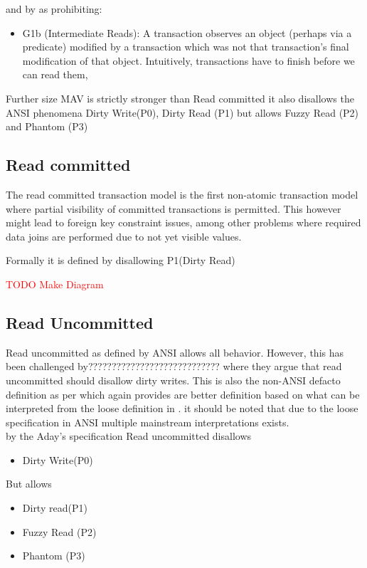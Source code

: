 \documentclass[a4paper,10pt,titlepage]{report}
\begin{document}
and by \cite{Adya99weakconsistency:} as prohibiting:
\begin{itemize}
    \item G1b (Intermediate Reads): A transaction observes an object (perhaps via a predicate) modified by a transaction which was not that transaction's final modification of that object. Intuitively, transactions have to finish before we can read them,
\end{itemize}

Further size MAV is strictly stronger than Read committed it also disallows the ANSI phenomena Dirty Write(P0), Dirty Read (P1) but allows Fuzzy Read (P2) and Phantom (P3)

\subsection{Read committed}
The read committed transaction model is the first non-atomic transaction model where partial visibility of committed transactions is permitted. This however might lead to foreign key constraint issues, among other problems where required data joins are performed due to not yet visible values.


Formally it is defined \cite{ansisql1999} by disallowing P1(Dirty Read)

\textcolor{red}{TODO Make Diagram}



\subsection{Read Uncommitted}
Read uncommitted as defined by ANSI allows all behavior. However, this has been challenged by???????????????????????????? \cite{Berensonetal} where they argue that read uncommitted should disallow dirty writes. This is also the non-ANSI defacto definition as per \cite{Adya99weakconsistency:} which again provides are better definition based on what can be interpreted from the loose definition in \cite{ansisql1999}. it should be noted that due to the loose specification in ANSI multiple mainstream interpretations exists.\\

by the Aday's specification Read uncommitted disallows
\begin{itemize}
    \item Dirty Write(P0)
\end{itemize}
But allows
\begin{itemize}
    \item Dirty read(P1)
    \item Fuzzy Read (P2)
    \item Phantom (P3)
\end{itemize}
\end{document}

